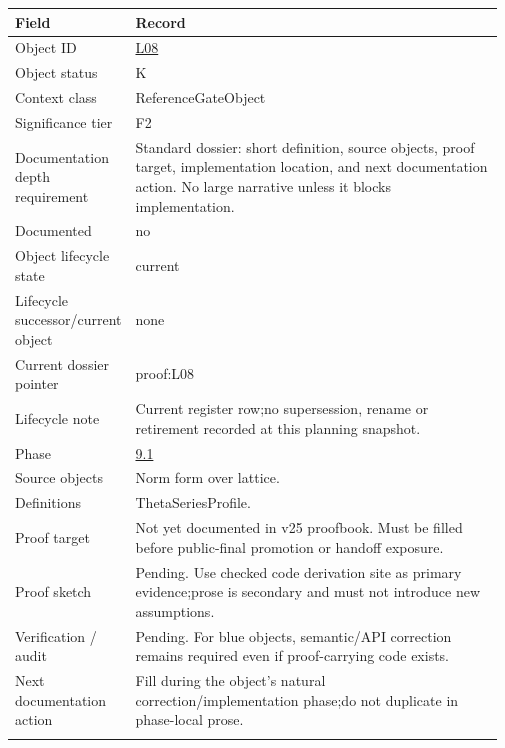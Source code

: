 \begin{longtable}{L{0.16\linewidth} L{0.81\linewidth}}
\hline
\textbf{Field} & \textbf{Record}\\
\hline
Object ID & \hyperlink{object-row-L08}{L08}\\
\hline\addlinespace[0.20em]
Object status & K\\
\hline\addlinespace[0.20em]
Context class & ReferenceGateObject\\
\hline\addlinespace[0.20em]
Significance tier & F2\\
\hline\addlinespace[0.20em]
Documentation depth requirement & Standard dossier: short definition, source objects, proof target, implementation location, and next documentation action. No large narrative unless it blocks implementation.\\
\hline\addlinespace[0.20em]
Documented & no\\
\hline\addlinespace[0.20em]
Object lifecycle state & current\\
\hline\addlinespace[0.20em]
Lifecycle successor/\allowbreak{}current object & none\\
\hline\addlinespace[0.20em]
Current dossier pointer & proof:L08\\
\hline\addlinespace[0.20em]
Lifecycle note & Current register row;\newline no supersession, rename or retirement recorded at this planning snapshot.\\
\hline\addlinespace[0.20em]
Phase & \hyperlink{phase-row-9-1}{9.1}\\
\hline\addlinespace[0.20em]
Source objects & Norm form over lattice.\\
\hline\addlinespace[0.20em]
Definitions & ThetaSeriesProfile.\\
\hline\addlinespace[0.20em]
Proof target & Not yet documented in v25 proofbook. Must be filled before public-final promotion or handoff exposure.\\
\hline\addlinespace[0.20em]
Proof sketch & Pending. Use checked code derivation site as primary evidence;\newline prose is secondary and must not introduce new assumptions.\\
\hline\addlinespace[0.20em]
Verification /\allowbreak{} audit & Pending. For blue objects, semantic/\allowbreak{}API correction remains required even if proof-carrying code exists.\\
\hline\addlinespace[0.20em]
Next documentation action & Fill during the object's natural correction/\allowbreak{}implementation phase;\newline do not duplicate in phase-local prose.\\
\hline\addlinespace[0.20em]
\end{longtable}

